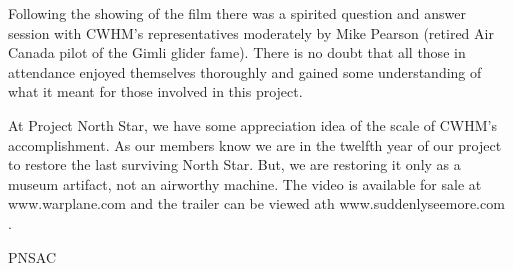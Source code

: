 Following the showing of the film there was a spirited question and answer
session with CWHM's representatives moderately by Mike Pearson (retired Air
Canada pilot of the Gimli glider fame). There is no doubt that all those in
attendance enjoyed themselves thoroughly and gained some understanding of what
it meant for those involved in this project.


At Project North Star, we have some appreciation idea of the scale of CWHM's
accomplishment. As our members know we are in the twelfth year of our project to
restore the last surviving North Star. But, we are restoring it only as a museum
artifact, not an airworthy machine. The video is available for sale at
www.warplane.com and the trailer can be viewed ath www.suddenlyseemore.com .






\begin{footnotesize}
    \raggedleft PNSAC\\
\end{footnotesize}



